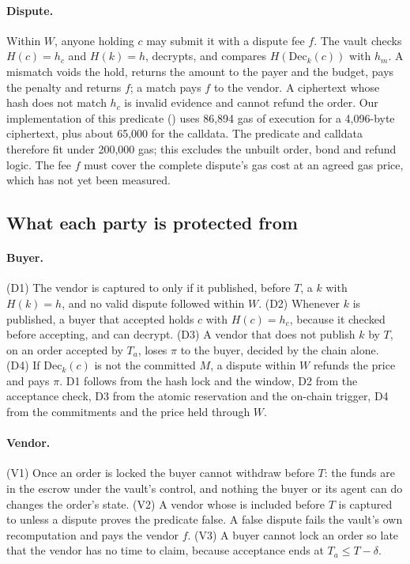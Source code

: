 \paragraph{Dispute.} Within $W$, anyone holding $c$ may submit it with a dispute fee $f$. The vault checks $H(c) = h_c$ and $H(k) = h$, decrypts, and
compares $H(\mathrm{Dec}_k(c))$ with $h_m$. A mismatch voids the hold, returns the amount to the payer and the budget, pays the penalty and returns $f$; a
match pays $f$ to the vendor. A ciphertext whose hash does not match $h_c$ is invalid evidence and cannot refund the order. Our implementation of this predicate () uses 86{,}894 gas of execution for a 4{,}096-byte
ciphertext, plus about 65{,}000 for the calldata. The predicate and calldata therefore fit under 200{,}000 gas; this excludes the unbuilt order,
bond and refund logic. The fee $f$ must cover the complete dispute's gas cost at an agreed gas price, which has not yet been measured.

\subsection{What each party is protected from}

\paragraph{Buyer.} (D1) The vendor is captured to only if it published, before $T$, a $k$ with $H(k) = h$, and no valid dispute followed within $W$.
(D2) Whenever $k$ is published, a buyer that accepted holds $c$ with $H(c) = h_c$, because it checked before accepting, and can decrypt.
(D3) A vendor that does not publish $k$ by $T$, on an order accepted by $T_a$, loses $\pi$ to the buyer, decided by the chain alone.
(D4) If $\mathrm{Dec}_k(c)$ is not the committed $M$, a dispute within $W$ refunds the price and pays $\pi$. D1 follows from the hash lock and the
window, D2 from the acceptance check, D3 from the atomic reservation and the on-chain trigger, D4 from the commitments and the price held through $W$.

\paragraph{Vendor.} (V1) Once an order is locked the buyer cannot withdraw before $T$: the funds are in the escrow under the vault's control, and nothing the
buyer or its agent can do changes the order's state. (V2) A vendor whose  is included before $T$ is captured to unless a dispute proves the
predicate false. A false dispute fails the vault's own recomputation and pays the vendor $f$. (V3) A buyer cannot lock an order so late that the vendor
has no time to claim, because acceptance ends at $T_a \le T - \delta$.

